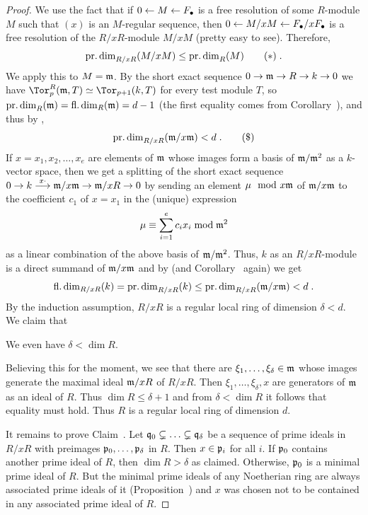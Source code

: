 \documentclass[a4paper,parskip=half,numbers=enddot, DIV=12]{scrreprt}
\begin{document}
\begin{proof}
	We use the fact that if $0\lmorphism M\lmorphism F_\bullet$ is a free resolution of some $R$-module $M$ such that $(x)$ is an $M$-regular sequence, then $0\lmorphism M/xM\lmorphism F_\bullet/xF_\bullet$ is a free resolution of the $R/xR$-module $M/xM$ (pretty easy to see). Therefore,
	\begin{align}\lbl{eq:pdimOfM/xMandM}
		\pdim_{R/xR}(M/xM)\leq \pdim_R(M)\tag{$*$}\;.
	\end{align}
	We apply this to $M=\mathfrak{m}$. By the short exact sequence $0\morphism\mm\morphism R\morphism k\morphism 0$ we have $\Tor_p^R(\mm,T)\simeq\Tor_{p+1}(k,T)$ for every test module $T$, so $\operatorname{pr.dim}_R(\mathfrak{m})=\operatorname{fl.dim}_R(\mathfrak{m})=d-1$ (the first equality comes from Corollary~), and thus by ,
	\begin{align}\lbl{eq:pdimIneq2}
		\pdim_{R/xR}(\mm/x\mm)<d\;.\tag{\$}
	\end{align}
	If $x=x_1,x_2,\ldots,x_e$ are elements of $\mathfrak{m}$ whose images form a basis of $\mathfrak{m}/\mathfrak{m}^2$ as a $k$-vector space, then we get a splitting of the short exact sequence $0\morphism k\morphism[x\cdot ]\mm/x\mm\morphism\mm/xR\morphism 0$
	by sending an element $\mu\mod x\mathfrak{m}$ of $\mathfrak{m}/x\mathfrak{m}$ to the coefficient $c_1$ of $x=x_1$ in the (unique) expression
	\begin{align*}
		\mu\equiv\sum_{i=1}^ec_ix_i\bmod\mathfrak{m}^2
	\end{align*}
	as a linear combination of the above basis of $\mathfrak{m}/\mathfrak{m}^2$. Thus, $k$ as an $R/xR$-module is a direct summand of $\mathfrak{m}/x\mathfrak{m}$ and by  (and Corollary~ again) we get
	\begin{align*}
		\operatorname{fl.dim}_{R/xR}(k)= \operatorname{pr.dim}_{R/xR}(k)\leq \operatorname{pr.dim}_{R/xR}(\mathfrak{m}/x\mathfrak{m})<d\;.
	\end{align*}
	By the induction assumption, $R/xR$ is a regular local ring of dimension $\delta<d$. We claim that
	\begin{claim}
		We even have $\delta<\dim R$.
	\end{claim}
	Believing this for the moment, we see that there are $\xi_1,\ldots,\xi_\delta\in\mathfrak{m}$ whose images generate the maximal ideal $\mathfrak{m}/xR$ of $R/xR$. Then $\xi_1,\ldots,\xi_\delta,x$ are generators of $\mathfrak{m}$ as an ideal of $R$. Thus $\dim R\leq \delta+1$ and from $\delta<\dim R$ it follows that equality must hold. Thus $R$ is a regular local ring of dimension $d$.
	
	It remains to prove Claim~. Let $\mathfrak{q}_0\subsetneq\ldots\subsetneq\mathfrak{q}_\delta$ be a sequence of prime ideals in $R/xR$ with preimages $\mathfrak{p}_0,\ldots,\mathfrak{p}_\delta$ in $R$. Then $x\in\mathfrak{p}_i$ for all $i$. If $\mathfrak{p}_0$ contains another prime ideal of $R$, then $\dim R>\delta$ as claimed. Otherwise, $\mathfrak{p}_0$ is a minimal prime ideal of $R$. But the minimal prime ideals of any Noetherian ring are always associated prime ideals of it (Proposition~) and $x$ was chosen not to be contained in any associated prime ideal of $R$.
\end{proof}
\end{document}
